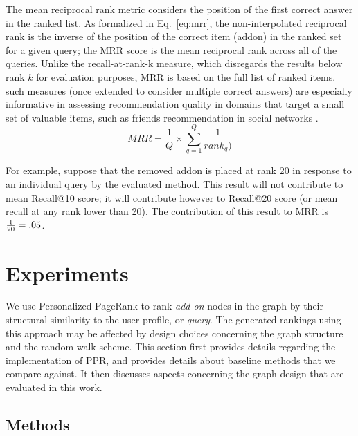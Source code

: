 \documentclass[11pt,oneside]{book}
\let\Oldsection\section
\renewcommand{\section}{\FloatBarrier\Oldsection}
\let\Oldsubsection\subsection
\renewcommand{\subsection}{\FloatBarrier\Oldsubsection}
\begin{document}
The mean reciprocal rank metric \citep{voorhees1999trec} considers the position of the first correct answer in the ranked list.  As formalized in Eq.~\eqref{eq:mrr}, the non-interpolated reciprocal rank is the inverse of the position of the correct item (addon) in the ranked set for a given query; the MRR score is the mean reciprocal rank across all of the queries. Unlike the recall-at-rank-k measure, which disregards the results below rank $k$ for evaluation purposes, MRR is based on the full list of ranked items. such measures (once extended to consider multiple correct answers) are especially informative in assessing recommendation quality in domains that target a small set of valuable items, such as friends recommendation in social
networks \citep{chen2006less}. 
\begin{equation}
 MRR = \frac{1}{Q} \times \displaystyle\sum\limits_{q=1}^{Q} \frac{1}{rank_q)}
\label{eq:mrr}
\end{equation}

For example, suppose that the removed addon is placed at rank 20 in response to an individual query by the evaluated method. This result will not contribute to mean Recall@10 score; it will contribute however to Recall@20 score (or mean recall at any rank lower than 20). The contribution of this result to MRR is ${1 \over 20}=.05$.

\section{Experiments}
\label{sec:experiments}

We use Personalized PageRank to rank {\it add-on} nodes in
the graph by their structural similarity to the user profile, or {\it
  query}. The generated rankings using this approach may be affected
by design choices concerning the graph structure and the random walk scheme. This section first provides details regarding the implementation of PPR, and provides details about baseline methods that we compare against. It then discusses aspects concerning the graph design that are evaluated in this work.

\subsection{Methods}
\label{sec:methods}
\end{document}
